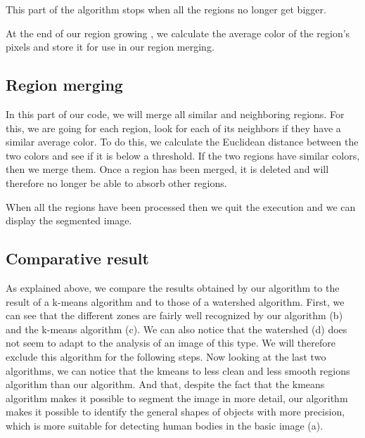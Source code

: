 \documentclass[conference]{IEEEtran}
\begin{document}
This part of the algorithm stops when all the regions no longer get bigger.

At the end of our region growing , we calculate the average color of the region's pixels and store it for use in our region merging.


\subsection{Region merging}

In this part of our code, we will merge all similar and neighboring regions. For this, we are going for each region, look for each of its neighbors if they have a similar average color. To do this, we calculate the Euclidean distance between the two colors and see if it is below a threshold. If the two regions have similar colors, then we merge them. Once a region has been merged, it is deleted and will therefore no longer be able to absorb other regions.

When all the regions have been processed then we quit the execution and we can display the segmented image.


\subsection{Comparative result}

As explained above, we compare the results obtained by our algorithm to the result of a k-means algorithm and to those of a watershed algorithm. First, we can see that the different zones are fairly well recognized by our algorithm (b) and the k-means algorithm (c). We can also notice that the watershed  (d) does not seem to adapt to the analysis of an image of this type. We will therefore exclude this algorithm for the following steps.
Now looking at the last two algorithms, we can notice that the kmeans to less clean and less smooth regions algorithm than our algorithm. And that, despite the fact that the kmeans algorithm makes it possible to segment the image in more detail, our algorithm makes it possible to identify the general shapes of objects with more precision, which is more suitable for detecting human bodies in the basic image (a). 
\end{document}
